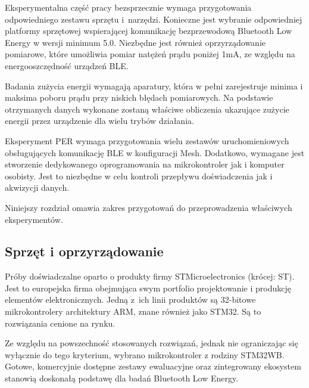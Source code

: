 Eksperymentalna część pracy bezsprzecznie wymaga przygotowania odpowiedniego zestawu
sprzętu i~narzędzi. Konieczne jest wybranie odpowiedniej platformy sprzętowej
wspierającej komunikację bezprzewodową Bluetooth Low Energy w wersji minimum 5.0.
Niezbędne jest również oprzyrządowanie pomiarowe, które umożliwia pomiar natężeń
prądu poniżej 1mA, ze względu na energooszczędność urządzeń \gls{BLE}.


Badania zużycia energii wymagają aparatury, która w pełni zarejestruje minima i maksima
poboru prądu przy niskich błędach pomiarowych. Na podstawie otrzymanych danych wykonane zostaną
właściwe obliczenia ukazujące zużycie energii przez urządzenie dla wielu trybów działania.

Eksperyment \gls{PER} wymaga przygotowania wielu zestawów uruchomieniowych obsługujących
komunikację BLE w konfiguracji Mesh. Dodatkowo, wymagane jest stworzenie dedykowanego oprogramowania
na mikrokontroler jak i komputer osobisty. Jest to niezbędne w celu kontroli przepływu
doświadczenia jak i akwizycji danych.

Niniejszy rozdział omawia zakres przygotowań do przeprowadzenia właściwych eksperymentów.


\subsection{Sprzęt i oprzyrządowanie}


Próby doświadczalne oparto o produkty firmy STMicroelectronics (krócej: ST). Jest to europejska firma
obejmująca swym portfolio projektowanie i produkcję elementów elektronicznych. Jedną
z~ich linii produktów są 32-bitowe mikrokontrolery architektury ARM, znane również jako STM32.
Są to rozwiązania cenione na rynku.

Ze względu na powszechność stosowanych rozwiązań, jednak nie ograniczając się wyłącznie do tego kryterium,
wybrano mikrokontroler z rodziny STM32WB. Gotowe, komercyjnie dostępne zestawy ewaluacyjne oraz
zintegrowany ekosystem stanowią doskonałą podstawę dla badań Bluetooth Low Energy.


